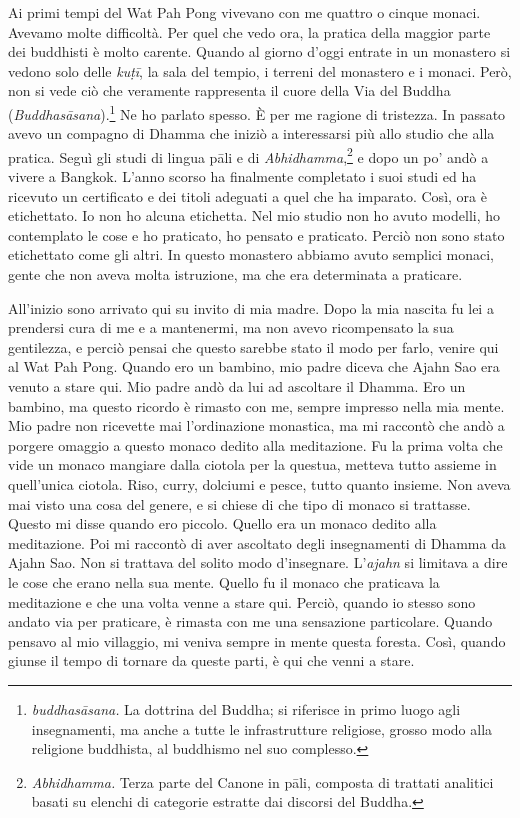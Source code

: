Ai primi tempi del Wat Pah Pong vivevano con me quattro o cinque monaci.
Avevamo molte difficoltà. Per quel che vedo ora, la pratica della
maggior parte dei buddhisti è molto carente. Quando al giorno d'oggi
entrate in un monastero si vedono solo delle \emph{kuṭī}, la sala del
tempio, i terreni del monastero e i monaci. Però, non si vede ciò che
veramente rappresenta il cuore della Via del Buddha
(\emph{Buddhasāsana}).\footnote{\emph{buddhasāsana.} La dottrina del
  Buddha; si riferisce in primo luogo agli insegnamenti, ma anche a
  tutte le infrastrutture religiose, grosso modo alla religione
  buddhista, al buddhismo nel suo complesso.} Ne ho parlato spesso. È
per me ragione di tristezza. In passato avevo un compagno di Dhamma che
iniziò a interessarsi più allo studio che alla pratica. Seguì gli studi
di lingua pāli e di \emph{Abhidhamma},\footnote{\emph{Abhidhamma.} Terza
  parte del Canone in pāli, composta di trattati analitici basati su
  elenchi di categorie estratte dai discorsi del Buddha.} e dopo un po'
andò a vivere a Bangkok. L'anno scorso ha finalmente completato i suoi
studi ed ha ricevuto un certificato e dei titoli adeguati a quel che ha
imparato. Così, ora è etichettato. Io non ho alcuna etichetta. Nel mio
studio non ho avuto modelli, ho contemplato le cose e ho praticato, ho
pensato e praticato. Perciò non sono stato etichettato come gli altri.
In questo monastero abbiamo avuto semplici monaci, gente che non aveva
molta istruzione, ma che era determinata a praticare.

All'inizio sono arrivato qui su invito di mia madre. Dopo la mia nascita
fu lei a prendersi cura di me e a mantenermi, ma non avevo ricompensato
la sua gentilezza, e perciò pensai che questo sarebbe stato il modo per
farlo, venire qui al Wat Pah Pong. Quando ero un bambino, mio padre
diceva che Ajahn Sao era venuto a stare qui. Mio padre andò da lui ad
ascoltare il Dhamma. Ero un bambino, ma questo ricordo è rimasto con me,
sempre impresso nella mia mente. Mio padre non ricevette mai
l'ordinazione monastica, ma mi raccontò che andò a porgere omaggio a
questo monaco dedito alla meditazione. Fu la prima volta che vide un
monaco mangiare dalla ciotola per la questua, metteva tutto assieme in
quell'unica ciotola. Riso, curry, dolciumi e pesce, tutto quanto
insieme. Non aveva mai visto una cosa del genere, e si chiese di che
tipo di monaco si trattasse. Questo mi disse quando ero piccolo. Quello
era un monaco dedito alla meditazione. Poi mi raccontò di aver ascoltato
degli insegnamenti di Dhamma da Ajahn Sao. Non si trattava del solito
modo d'insegnare. L'\emph{ajahn} si limitava a dire le cose che erano
nella sua mente. Quello fu il monaco che praticava la meditazione e che
una volta venne a stare qui. Perciò, quando io stesso sono andato via
per praticare, è rimasta con me una sensazione particolare. Quando
pensavo al mio villaggio, mi veniva sempre in mente questa foresta.
Così, quando giunse il tempo di tornare da queste parti, è qui che venni
a stare.

